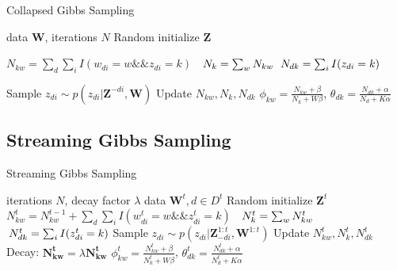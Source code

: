 \documentclass{article} %
\begin{document}
\begin{algorithm}[tb]
   \caption{Collapsed Gibbs Sampling}
   \label{alg:CGS}
\begin{algorithmic}
    data $\bm{W}$, iterations $N$
   \STATE Random initialize $\bm{Z}$

	   \STATE $N_{kw}=\sum_d\sum_i I(w_{di}=w \&\& z_{di}=k)$ 
	   \STATE $\phantom{N_{kw}}\mathllap{N_k}=\sum_w N_{kw}$
	   \STATE $\phantom{N_{kw}}\mathllap{N_{dk}}=\sum_i I(z_{di}=k)$
   \ENDFOR   
	
	  			\STATE Sample $z_{di}\sim p(z_{di}|\bm{Z}^{-di},\bm{W})$
  				\STATE Update $N_{kw}, N_k, N_{dk}$
  			\ENDFOR
  		\ENDFOR
   \ENDFOR
   		$\phi_{kw}=\frac{N_{kw}+\beta}{N_{k}+W\beta}$,
		$\theta_{dk}=\frac{N_{dk}+\alpha}{N_{d}+K\alpha}$
\end{algorithmic}
\end{algorithm}

\subsection{Streaming Gibbs Sampling}

\begin{algorithm}[tb]
   \caption{Streaming Gibbs Sampling} 
   \label{alg:SGS}
\begin{algorithmic}
    iterations $N$, decay factor $\lambda$
	    data $\bm{W}^t, d\in D^t $
	   \STATE Random initialize $\bm{Z}^t$
		   \STATE $N_{kw}^{t}=N_{kw}^{t-1}+\sum_{d}\sum_i I(w_{di}^t=w \&\& z_{di}^t=k)$
		   \STATE $\phantom{N_{kw}^{t}}\mathllap{N_k^{t}}=\sum_w N_{kw}^{t}$
		   \STATE $\phantom{N_{kw}^{t}}\mathllap{N_{dk}^t}=\sum_i I(z_{di}^t=k)$
	   \ENDFOR	   
	  		  			\STATE Sample $z_{di}\sim p(z_{di}|\bm{Z}_{-di}^{1:t},\bm{W}^{1:t})$
  			  			\STATE Update $N_{kw}^{t}, N_k^{t}, N_{dk}^t$
  			  		\ENDFOR
  		  		\ENDFOR
	   \ENDFOR
	   \STATE Decay: $\bm{N_{kw}^{t}}=\lambda \bm{N_{kw}^{t}}$
 	   		$\phi_{kw}^t=\frac{N_{kw}^t+\beta}{N_{k}^t+W\beta}$,
			$\theta_{dk}^t=\frac{N_{dk}^t+\alpha}{N_{d}^t+K\alpha}$  		   		
   \ENDFOR   
\end{algorithmic}
\end{algorithm}
\end{document}
